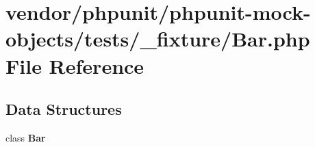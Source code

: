 \section{vendor/phpunit/phpunit-\/mock-\/objects/tests/\+\_\+fixture/\+Bar.php File Reference}
\label{_bar_8php}
\subsection*{Data Structures}
\begin{DoxyCompactItemize}
\item 
class {\bf Bar}
\end{DoxyCompactItemize}

